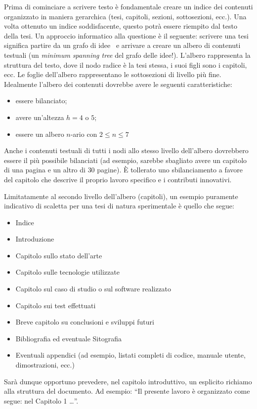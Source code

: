 \documentclass[12pt]{report}
\begin{document}
Prima di cominciare a scrivere testo \`e fondamentale creare un indice dei contenuti organizzato in maniera gerarchica (tesi, capitoli, sezioni, sottosezioni, ecc.). Una volta ottenuto un indice soddisfacente, questo potr\`a essere riempito dal testo della tesi. 
Un approccio informatico alla questione \`e il seguente: scrivere una tesi significa partire da un grafo di idee~\cite{hamalainen2019web} e arrivare a creare un albero di contenuti testuali (un \textit{minimum spanning tree} del grafo delle idee!). L'albero rappresenta la struttura del testo, dove il nodo radice \`e la tesi stessa, i suoi figli sono i capitoli, ecc. Le foglie dell'albero rappresentano le sottosezioni di livello pi\`u fine.  
%
Idealmente l'albero dei contenuti dovrebbe avere le seguenti caratteristiche:
\begin{itemize}
\item essere bilanciato;
\item avere un'altezza $h=4$ o $5$; 
\item essere un albero $n$-ario con $2\leq n \leq 7$
\end{itemize}
Anche i contenuti testuali di tutti i nodi allo stesso livello dell'albero dovrebbero essere il pi\`u possibile bilanciati (ad esempio, sarebbe sbagliato avere un capitolo di una pagina e un altro di $30$ pagine).
\`{E} tollerato uno sbilanciamento a favore del capitolo che descrive il proprio lavoro specifico e i  contributi innovativi.

Limitatamente al secondo livello dell'albero (capitoli), un esempio puramente indicativo di scaletta per una tesi di natura sperimentale è quello che segue:
\begin{itemize}
	\item Indice
	\item Introduzione
	\item Capitolo sullo stato dell'arte
	\item Capitolo sulle tecnologie utilizzate
	\item Capitolo sul caso di studio o sul software realizzato
	\item Capitolo sui test effettuati
	\item Breve capitolo su conclusioni e sviluppi futuri
	\item Bibliografia ed eventuale Sitografia
	\item Eventuali appendici (ad esempio, listati completi di codice, manuale utente, dimostrazioni, ecc.)
\end{itemize}
Sarà dunque opportuno prevedere, nel capitolo introduttivo, un esplicito richiamo alla struttura del documento. Ad esempio: ``Il presente lavoro \`{e} organizzato come segue: nel Capitolo 1 \dots''.
\end{document}
